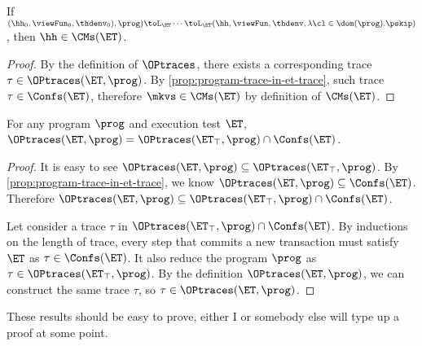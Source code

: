 \begin{corollary}
If $(\hh_{0}, \viewFun_{0}, \thdenv_{0}), \prog) \toL_{\ET} \cdots \toL_{\ET} 
(\hh, \viewFun, \thdenv, \lambda \cl \in \dom(\prog). \pskip)$, then $\hh \in \CMs(\ET)$.
\end{corollary}
\begin{proof}
    By the definition of \( \OPtraces \), 
    there exists a corresponding trace \( \tau \in \OPtraces(\ET, \prog) \).
    By \cref{prop:program-trace-in-et-trace}, such trace \( \tau \in \Confs(\ET) \),
    therefore \( \mkvs \in \CMs(\ET)\) by definition of \( \CMs(\ET) \).
\end{proof}

\begin{proposition}
For any program $\prog$ and execution test $\ET$, $\OPtraces(\ET, \prog) = \OPtraces(\ET_{\top}, \prog) 
\cap \Confs(\ET)$.
\end{proposition}
\begin{proof}
    It is easy to see \(\OPtraces(\ET, \prog) \subseteq \OPtraces(\ET_\top, \prog) \).
    By \cref{prop:program-trace-in-et-trace}, we know \( \OPtraces(\ET, \prog) \subseteq \Confs(\ET)\).
    Therefore \(  \OPtraces(\ET, \prog) \subseteq \OPtraces(\ET_\top, \prog) \cap \Confs(\ET) \).

    Let consider a trace \( \tau \) in \( \OPtraces(\ET_\top, \prog) \cap \Confs(\ET) \).
    By inductions on the length of trace, 
    every step that commits a new transaction  must satisfy \( \ET \) as \( \tau \in \Confs(\ET) \).
    It also reduce the program \( \prog \) as \( \tau \in \OPtraces(\ET_\top, \prog) \).
    By the definition \( \OPtraces(\ET, \prog) \),
    we can construct the same trace \( \tau \),
    so \( \tau \in \OPtraces(\ET, \prog) \).
\end{proof}

\ac{These results should be easy to prove, either I or somebody else will type up a proof 
at some point.}

